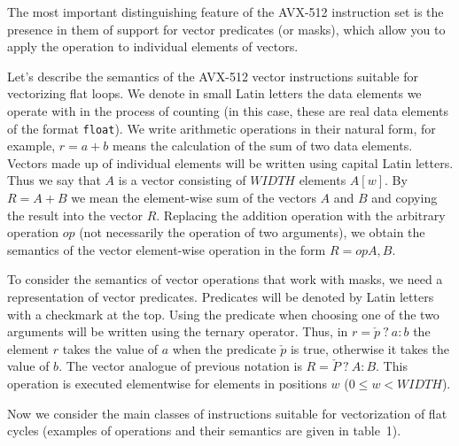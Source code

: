 \documentclass[
11pt,%
tightenlines,%
twoside,%
onecolumn,%
nofloats,%
nobibnotes,%
nofootinbib,%
superscriptaddress,%
noshowpacs,%
centertags]%
{revtex4}
\begin{document}
The most important distinguishing feature of the AVX-512 instruction set is the presence in them of support for vector predicates (or masks), which allow you to apply the operation to individual elements of vectors.

Let's describe the semantics of the AVX-512 vector instructions suitable for vectorizing flat loops.
We denote in small Latin letters the data elements we operate with in the process of counting (in this case, these are real data elements of the format \texttt{float}).
We write arithmetic operations in their natural form, for example, $r = a + b$ means the calculation of the sum of two data elements.
Vectors made up of individual elements will be written using capital Latin letters.
Thus we say that $A$ is a vector consisting of $WIDTH$ elements $A[w]$.
By $R = A + B$ we mean the element-wise sum of the vectors $A$ and $B$ and copying the result into the vector $R$.
Replacing the addition operation with the arbitrary operation $op$ (not necessarily the operation of two arguments), we obtain the semantics of the vector element-wise operation in the form $R = op A, B$.

To consider the semantics of vector operations that work with masks, we need a representation of vector predicates.
Predicates will be denoted by Latin letters with a checkmark at the top.
Using the predicate when choosing one of the two arguments will be written using the ternary operator.
Thus, in $r = \check{p} \ ? \ a : b$ the element $r$ takes the value of $a$ when the predicate $\check{p}$ is true, otherwise it takes the value of $b$.
The vector analogue of previous notation is $R = \check{P} \ ? \ A : B$.
This operation is executed elementwise for elements in positions $w$ ($0 \le w < WIDTH$).

Now we consider the main classes of instructions suitable for vectorization of flat cycles (examples of operations and their semantics are given in table~1).
\end{document}
